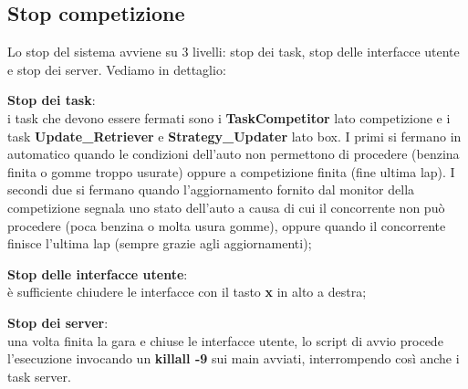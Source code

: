 \subsection{Stop competizione}
Lo stop del sistema avviene su 3 livelli: stop dei task, stop delle interfacce utente e stop dei server. Vediamo in dettaglio:
\begin{description}
\item{\textbf{Stop dei task}}:\\
i task che devono essere fermati sono i \textbf{TaskCompetitor} lato competizione e i task \textbf{Update\_Retriever} e \textbf{Strategy\_Updater} lato box.
I primi si fermano in automatico quando le condizioni dell'auto non permettono di procedere (benzina finita o gomme troppo usurate) oppure a competizione finita
(fine ultima lap). I secondi due si fermano quando l'aggiornamento fornito dal monitor della competizione segnala uno stato dell'auto a causa di cui il 
concorrente non pu\`{o} procedere (poca benzina o molta usura gomme), oppure quando il concorrente finisce l'ultima lap (sempre grazie agli aggiornamenti);
\item{\textbf{Stop delle interfacce utente}}:\\
\`{e} sufficiente chiudere le interfacce con il tasto \textbf{x} in alto a destra;
\item{\textbf{Stop dei server}}:\\
una volta finita la gara e chiuse le interfacce utente, lo script di avvio procede l'esecuzione invocando un \textbf{killall -9} sui main avviati, interrompendo
cos\`{i} anche i task server.
\end{description}